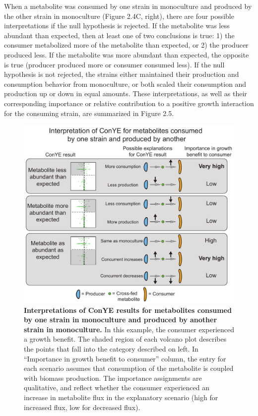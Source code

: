 \documentclass[11pt,twocolumn,notitlepage,openany,twoside]{book}
\begin{document}
\begin{refsection}
When a metabolite was consumed by one strain in monoculture and produced by the other strain in monoculture (Figure 2.4C, right), there are four possible interpretations if the null hypothesis is rejected. If the metabolite was less abundant than expected, then at least one of two conclusions is true: 1) the consumer metabolized more of the metabolite than expected, or 2) the producer produced less. If the metabolite was more abundant than expected, the opposite is true (producer produced more or consumer consumed less). If the null hypothesis is not rejected, the strains either maintained their production and consumption behavior from monoculture, or both scaled their consumption and production up or down in equal amounts. These interpretations, as well as their corresponding importance or relative contribution to a positive growth interaction for the consuming strain, are summarized in Figure 2.5.

\begin{figure}[tb]
\centering
\includegraphics[width=\linewidth]{ch2_fig5}
\caption[Interpretations of ConYE results for metabolites consumed by one strain in monoculture and produced by another strain in monoculture.]{\textbf{Interpretations of ConYE results for metabolites consumed by one strain in monoculture and produced by another strain in monoculture.} In this example, the consumer experienced a growth benefit. The shaded region of each volcano plot describes the points that fall into the category described on left. In “Importance in growth benefit to consumer” column, the entry for each scenario assumes that consumption of the metabolite is coupled with biomass production. The importance assignments are qualitative, and reflect whether the consumer experienced an increase in metabolite flux in the explanatory scenario (high for increased flux, low for decreased flux).}
\end{figure}


\end{refsection}
\end{document}
